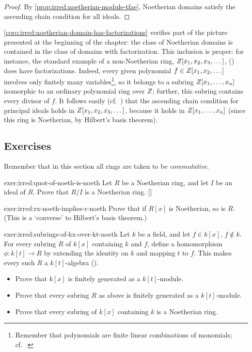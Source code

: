 \begin{proof}
  By \cref{prop:irred:noetherian-module-tfae}, Noetherian domains satisfy the ascending
  chain condition for all ideals.
\end{proof}

\cref{coro:irred:noetherian-domain-has-factorizations} verifies part of the picture presented at the
beginning of the chapter: the class of Noetherian domains is contained
in the class of domains with factorization. This inclusion is proper:
for instance, the standard example of a non-Noetherian ring,
$Z[x_1, x_2, x_3, \dots]$, ()
does have factorizations. Indeed, every given polynomial
$f \in Z[x_1, x_2, \dots]$ involves only finitely many
variables\footnote{Remember that polynomials are finite linear
  combinations of monomials;
  cf.~.}, so it belongs to a
subring $Z[x_1, \dots, x_n]$ isomorphic to an ordinary polynomial
ring over $Z$; further, this subring contains every divisor of
$f$. It follows easily (cf.\
) that the
ascending chain condition for principal ideals holds in
$Z[x_1, x_2, x_3, \dots]$, because it holds in $Z[x_1, \dots, x_n]$
(since this ring is Noetherian, by Hilbert's basis theorem).

\subsection*{Exercises}

Remember that in this section all rings are taken to be
\emph{commutative}.
\begin{exer}{\exerused}{exer:irred:quot-of-noeth-is-noeth}
  Let $R$ be a Noetherian ring, and let $I$ be an ideal of $R$. Prove
  that $R/I$ is a Noetherian
  ring. []
\end{exer}

\begin{exer}{}{exer:irred:rx-noeth-implies-r-noeth}
  Prove that if $R[x]$ is Noetherian, so is $R$. (This is a `converse'
  to Hilbert's basis theorem.)
\end{exer}

\begin{exer}{}{exer:irred:subrings-of-kx-over-kt-noeth}
  Let $k$ be a field, and let $f \in k[x]$, $f \notin k$. For every
  subring $R$ of $k[x]$ containing $k$ and $f$, define a homomorphism
  $\phi : k[t] \to R$ by extending the identity on $k$ and mapping $t$
  to $f$. This makes every such $R$ a $k[t]$-algebra
  ().
  \begin{itemize}
  \item Prove that $k[x]$ is finitely generated as a $k[t]$-module.
  \item Prove that every subring $R$ as above is finitely generated as
    a $k[t]$-module.
  \item Prove that every subring of $k[x]$ containing $k$ is a
    Noetherian ring.
  \end{itemize}
\end{exer}

